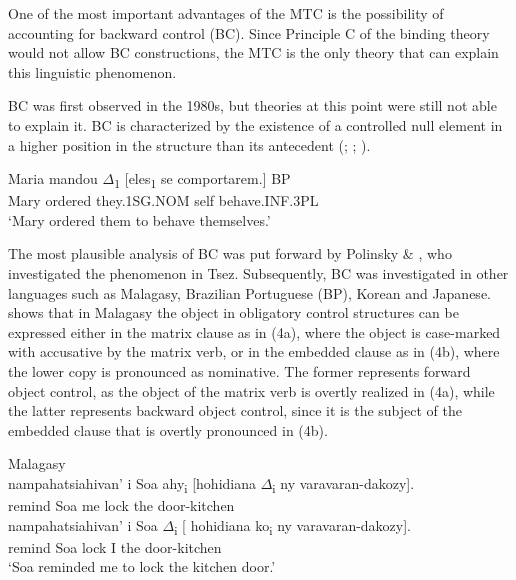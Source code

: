 \documentclass[output=paper]{langsci/langscibook}
\begin{document}
One of the most important advantages of the MTC is the possibility of accounting for backward control (BC). Since Principle C of the binding theory would not allow BC constructions, the MTC is the only theory that can explain this linguistic phenomenon. 

BC was first observed in the 1980s, but theories at this point were still not able to explain it. BC is characterized by the existence of a controlled null element in a higher position in the structure than its antecedent (\citealt{Farell1995}; \citealt{Rodrigues2004}; \citealt{Boeckx2006}). 

\ea%
    \label{ex:moreno:3}
    \gll Maria mandou ${\Delta}$\textsubscript{1} [eles\textsubscript{1} se comportarem.]  BP\\
         Mary ordered they.1SG.NOM self behave.INF.3PL\\
    \glt ‘Mary ordered them to behave themselves.’
    \z

The most plausible analysis of BC was put forward by Polinsky \& \citet{Potsdam2002}, who investigated the phenomenon in Tsez. Subsequently, BC was investigated in other languages such as Malagasy, Brazilian Portuguese (BP), Korean and Japanese. \citet{Potsdam2009} shows that in Malagasy the object in obligatory control structures can be expressed either in the matrix clause as in (4a), where the object is case-marked with accusative by the matrix verb, or in the embedded clause as in (4b), where the lower copy is pronounced as nominative. The former represents forward object control, as the object of the matrix verb is overtly realized in (4a), while the latter represents backward object control, since it is the subject of the embedded clause that is overtly pronounced in (4b). 

\ea%
    Malagasy \citep[755]{Potsdam2009}\label{ex:moreno:4}\\
    \ea
    \gll nampahatsiahivan’ i Soa  ahy\textsubscript{i} [hohidiana ${\Delta}$\textsubscript{i}   ny varavaran-dakozy].\\
         remind            Soa   me    lock               the door-kitchen\\
    \ex
    \gll nampahatsiahivan’ i Soa  ${\Delta}$\textsubscript{i}        [  hohidiana ko\textsubscript{i}   ny varavaran-dakozy].\\
         remind                    Soa     lock          I      the door-kitchen\\
    \glt ‘Soa reminded me to lock the kitchen door.’
    \z
\z
\end{document}
